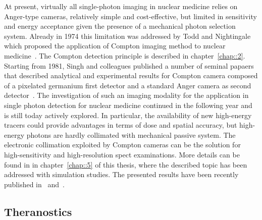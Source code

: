 At present, virtually all single-photon imaging in nuclear medicine relies on Anger-type cameras, relatively simple and cost-effective, but limited in sensitivity and energy acceptance given the presence of a mechanical photon selection system. Already in 1974 this limitation was addressed by Todd and Nightingale which proposed the application of Compton imaging method to nuclear medicine~\parencite{Todd1974}. The Compton detection principle is described in chapter~\ref{chap::2}. Starting from 1981, Singh and colleagues published a number of seminal papaers that described analytical and experimental results for Compton camera composed of a pixelated germanium first detector and a standard Anger camera as second detector~\parencite{Singh1981, Singh1983, Singh1983b}. The investigation of such an imaging modality for the application in single photon detection for nuclear medicine continued in the following year and is still today actively explored. In particular, the availability of new high-energy tracers could provide advantages in terms of dose and spatial accuracy, but high-energy photons are hardly collimated with mechanical passive system. The electronic collimation exploited by Compton cameras can be the solution for high-sensitivity and high-resolution \gls{spect} examinations. More details can be found in in chapter~\ref{chap::5} of this thesis, where the described topic has been addressed with simulation studies. The presented results have been recently published in~\parencite{Fontana2017_PMB} and~\parencite{Fontana2017_APPB}. 

\subsection{Theranostics}\label{chap1::subsec::Theranostics}

